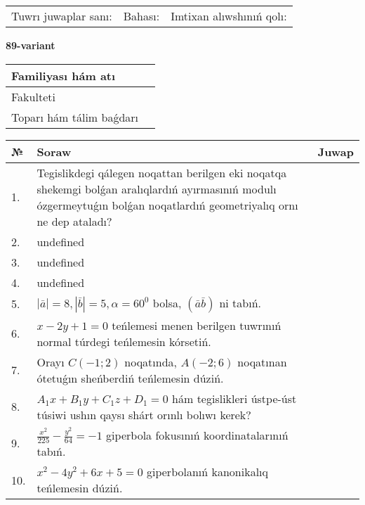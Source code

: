 \documentclass{article}
\begin{document}
\vspace{0.7cm}

\begin{tabular}{lll}
Tuwrı juwaplar sanı: \underline{\hspace{1cm}} & 
Bahası: \underline{\hspace{1cm}} & 
Imtixan alıwshınıń qolı: \underline{\hspace{2cm}} \\
\end{tabular}

\egroup

\newpage


\textbf{89-variant}\\

\bgroup
\def\arraystretch{1.6} %

\begin{tabular}{|m{5.7cm}|m{9.5cm}|}
\hline
Familiyası hám atı & \\
\hline
Fakulteti  & \\
\hline
Toparı hám tálim baǵdarı  & \\
\hline
\end{tabular}

\vspace{0.7cm}

\begin{tabular}{|m{0.7cm}|m{10cm}|m{4cm}|}
\hline
№ & Soraw & Juwap \\
\hline
1. & Tegislikdegi qálegen noqattan berilgen eki noqatqa shekemgi bolǵan aralıqlardıń ayırmasınıń modulı ózgermeytuǵın bolǵan noqatlardıń geometriyalıq ornı ne dep ataladı? &  \\
\hline
2. & undefined &  \\
\hline
3. & undefined &  \\
\hline
4. & undefined &  \\
\hline
5. & \(\left| \bar{a} \right| = 8, \left| \bar{b} \right| = 5, \alpha = 60^{0}\) bolsa, \(( \bar{a}\bar{b} )\) ni tabıń. &  \\
\hline
6. & \(x - 2 y + 1 = 0\) teńlemesi menen berilgen tuwrınıń normal túrdegi teńlemesin kórsetiń. &  \\
\hline
7. & Orayı \(C (- 1;2)\) noqatında, \(A (- 2;6 )\) noqatınan ótetuǵın sheńberdiń teńlemesin dúziń. &  \\
\hline
8. & \(A_{1}x + B_{1}y + C_{1}z + D_{1} = 0\) hám tegislikleri ústpe-úst túsiwi ushın qaysı shárt orınlı bolıwı kerek? &  \\
\hline
9. & \(\frac{x^{2}}{225} - \frac{y^{2}}{64} = - 1\) giperbola fokusınıń koordinatalarınıń tabıń. &  \\
\hline
10. & \(x^{2} - 4 y^{2} + 6 x + 5 = 0\) giperbolanıń kanonikalıq teńlemesin dúziń. & \\
\hline
\end{tabular}
\end{document}
